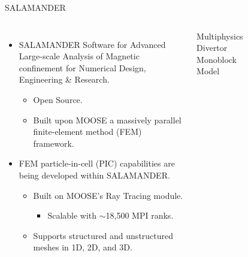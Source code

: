 
\begin{frame}{SALAMANDER}
  \begin{columns}
    \vspace{1.1cm}
    \begin{itemize}
      \item SALAMANDER \textemdash{} Software for Advanced Large-scale Analysis of Magnetic confinement for Numerical Design, Engineering \& Research.\cite{salamander2025}
      \begin{itemize}
          \item Open Source.
      \end{itemize}
      \begin{itemize}
        \item Built upon MOOSE \textemdash{} a massively parallel finite-element method (FEM) framework.
      \end{itemize}
       \item FEM particle-in-cell (PIC) capabilities are being developed within SALAMANDER.
      \begin{itemize}
        \item Built on MOOSE's Ray Tracing module.
        \begin{itemize}
            \item Scalable with $\sim$18,500 MPI ranks.\cite{gaston2021method}
        \end{itemize}
        \item Supports structured and unstructured meshes in 1D, 2D, and 3D.
      \end{itemize}
    \end{itemize}
    \centering
    Multiphysics Divertor Monoblock Model
    \vspace{-0.6cm}
    \begin{figure}
\end{figure}
\end{columns}
\end{frame}
